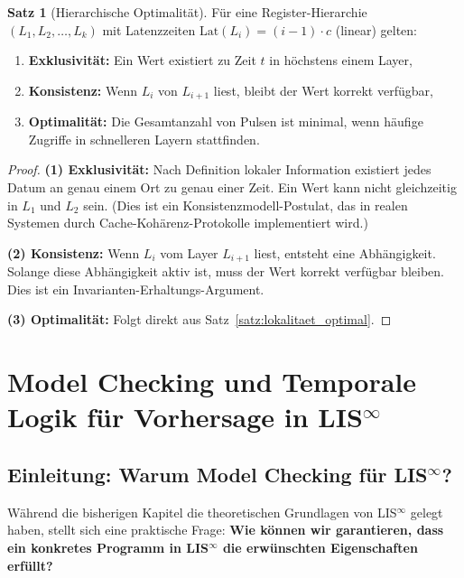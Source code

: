 \documentclass[a4paper,12pt]{article}
\theoremstyle{definition}
\newtheorem{satz}{Satz}
\begin{document}
	\begin{satz}[Hierarchische Optimalität]
		\label{satz:hierarchie_optimal}
		Für eine Register-Hierarchie $(L_1, L_2, \ldots, L_k)$ mit Latenzzeiten $\text{Lat}(L_i) = (i-1) \cdot c$ (linear) gelten:
		\begin{enumerate}
			\item \textbf{Exklusivität:} Ein Wert existiert zu Zeit $t$ in höchstens einem Layer,
			\item \textbf{Konsistenz:} Wenn $L_i$ von $L_{i+1}$ liest, bleibt der Wert korrekt verfügbar,
			\item \textbf{Optimalität:} Die Gesamtanzahl von Pulsen ist minimal, wenn häufige Zugriffe in schnelleren Layern stattfinden.
		\end{enumerate}
	\end{satz}
	
	\begin{proof}
		\textbf{(1) Exklusivität:} Nach Definition lokaler Information existiert jedes Datum an genau einem Ort zu genau einer Zeit. Ein Wert kann nicht gleichzeitig in $L_1$ und $L_2$ sein. (Dies ist ein Konsistenzmodell-Postulat, das in realen Systemen durch Cache-Kohärenz-Protokolle implementiert wird.)
		
		\textbf{(2) Konsistenz:} Wenn $L_i$ vom Layer $L_{i+1}$ liest, entsteht eine Abhängigkeit. Solange diese Abhängigkeit aktiv ist, muss der Wert korrekt verfügbar bleiben. Dies ist ein Invarianten-Erhaltungs-Argument.
		
		\textbf{(3) Optimalität:} Folgt direkt aus Satz~\ref{satz:lokalitaet_optimal}.
	\end{proof}
	
	\section{Model Checking und Temporale Logik für Vorhersage in LIS$^{\infty}$}
	\label{sec:model_checking_temporale_logik}
	
	\subsection{Einleitung: Warum Model Checking für LIS$^{\infty}$?}
	
	Während die bisherigen Kapitel die theoretischen Grundlagen von LIS$^{\infty}$ gelegt haben, stellt sich eine praktische Frage: \textbf{Wie können wir garantieren, dass ein konkretes Programm in LIS$^{\infty}$ die erwünschten Eigenschaften erfüllt?}
	
\end{document}
